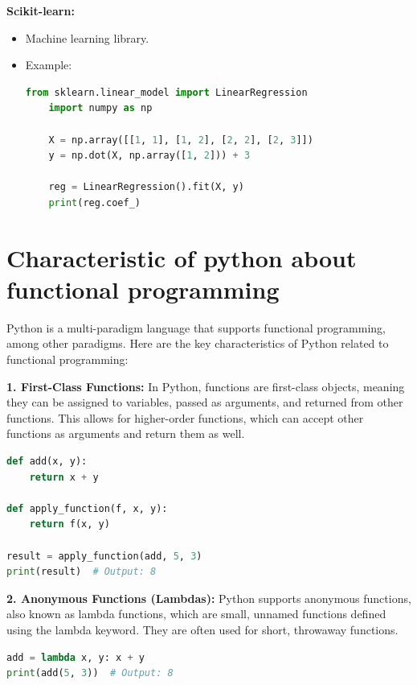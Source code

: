 \documentclass[12pt]{article}
\begin{document}
\textbf{Scikit-learn:}
\begin{itemize}
    \item Machine learning library.

    \item Example:\\
    \begin{lstlisting}[language = Python]
    from sklearn.linear_model import LinearRegression
    import numpy as np
    
    X = np.array([[1, 1], [1, 2], [2, 2], [2, 3]])
    y = np.dot(X, np.array([1, 2])) + 3
    
    reg = LinearRegression().fit(X, y)
    print(reg.coef_)
    \end{lstlisting}
    
\end{itemize}


\section{Characteristic of python about functional programming }
Python is a multi-paradigm language that supports functional programming, among other paradigms. Here are the key characteristics of Python related to functional programming:

\textbf{1. First-Class Functions:} In Python, functions are first-class objects, meaning they can be assigned to variables, passed as arguments, and returned from other functions. This allows for higher-order functions, which can accept other functions as arguments and return them as well.
\begin{lstlisting}[language = Python]
def add(x, y):
    return x + y

def apply_function(f, x, y):
    return f(x, y)

result = apply_function(add, 5, 3)
print(result)  # Output: 8
\end{lstlisting}

\vspace{0.5cm}

\textbf{2. Anonymous Functions (Lambdas):} Python supports anonymous functions, also known as lambda functions, which are small, unnamed functions defined using the lambda keyword. They are often used for short, throwaway functions.
\begin{lstlisting}[language = Python]
add = lambda x, y: x + y
print(add(5, 3))  # Output: 8
\end{lstlisting}

\vspace{0.5cm}
\end{document}
